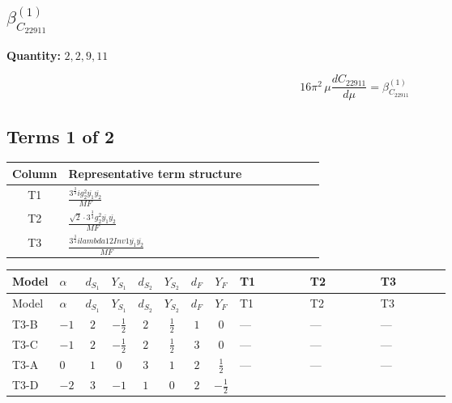 \documentclass[8pt]{article}
\begin{document}
\begin{landscape}
\section*{$\beta_{C_{22911}}^{(1)}$}
\noindent\textbf{Quantity: }$\mathrm{2,2,9,11}$\par\smallskip
\[16\pi^2\,\mu\frac{d C_{22911}}{d\mu}=\beta_{C_{22911}}^{(1)}\]
\subsection*{Terms 1 of 2}
\begin{center}
\begin{tabular}{@{}c >{\raggedright\arraybackslash}p{0.82\linewidth}@{}}
\toprule
Column & Representative term structure \\
\midrule
T1 & \(\displaystyle \frac{3^{\frac{3}{4}} i g_{2}^{2} \overline{y_{1}} \overline{y_{2}}}{MF}\) \\
\midrule
T2 & \(\displaystyle \frac{\sqrt{2} \cdot 3^{\frac{3}{4}} g_{2}^{2} \overline{y_{1}} \overline{y_{2}}}{MF}\) \\
\midrule
T3 & \(\displaystyle \frac{3^{\frac{3}{4}} i lambda12Inv1 \overline{y_{1}} \overline{y_{2}}}{MF}\) \\
\midrule
\bottomrule
\end{tabular}
\end{center}
\smallskip
\tiny
\begin{longtable}{@{}llcccccc >{\raggedright\arraybackslash}p{0.21\linewidth} >{\raggedright\arraybackslash}p{0.21\linewidth} >{\raggedright\arraybackslash}p{0.21\linewidth}@{}}
\toprule
Model & $\alpha$ & $d_{S_1}$ & $Y_{S_1}$ & $d_{S_2}$ & $Y_{S_2}$ & $d_F$ & $Y_F$ & T1 & T2 & T3 \\
\midrule
\endfirsthead
\toprule
Model & $\alpha$ & $d_{S_1}$ & $Y_{S_1}$ & $d_{S_2}$ & $Y_{S_2}$ & $d_F$ & $Y_F$ & T1 & T2 & T3 \\
\midrule
\endhead
T3-B & $-1$ & $2$ & $-\frac{1}{2}$ & $2$ & $\frac{1}{2}$ & $1$ & $0$ & --- & --- & --- \\
\midrule
T3-C & $-1$ & $2$ & $-\frac{1}{2}$ & $2$ & $\frac{1}{2}$ & $3$ & $0$ & --- & --- & --- \\
\midrule
T3-A & $0$ & $1$ & $0$ & $3$ & $1$ & $2$ & $\frac{1}{2}$ & --- & --- & --- \\
\midrule
T3-D & $-2$ & $3$ & $-1$ & $1$ & $0$ & $2$ & $-\frac{1}{2}$ & \scriptsize\adjustbox{max width=\linewidth}{$\begin{gathered} - \frac{17 \cdot 3^{\frac{3}{4}} i g_{2}^{2} \overline{y_{1}} \overline{y_{2}}}{24 MF}\end{gathered}$} & \scriptsize\adjustbox{max width=\linewidth}{$\begin{gathered} - \frac{\sqrt{2} \cdot 3^{\frac{3}{4}} g_{2}^{2} \overline{y_{1}} \overline{y_{2}}}{3 MF}\end{gathered}$} & \scriptsize\adjustbox{max width=\linewidth}{$\begin{gathered} - \frac{3^{\frac{3}{4}} i lambda12Inv1 \overline{y_{1}} \overline{y_{2}}}{6 MF}\end{gathered}$} \\

\end{longtable}
\end{landscape}
\end{document}
